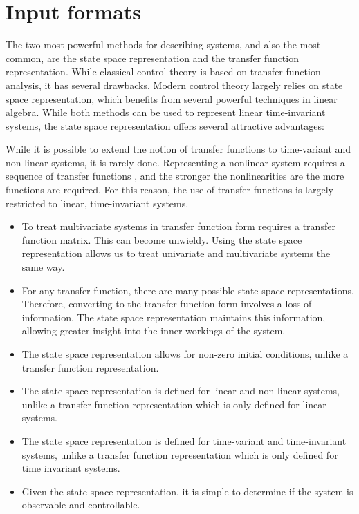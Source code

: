 \documentclass[\rootfolder/main.tex]{subfiles}
\begin{document}
\section{Input formats}

The two most powerful methods for describing systems, and also the most common, are the state space representation and the transfer function representation.
While classical control theory is based on transfer function analysis, it has several drawbacks.
Modern control theory largely relies on state space representation, which benefits from several powerful techniques in linear algebra.
While both methods can be used to represent linear time-invariant systems, the state space representation offers several attractive advantages:

While it is possible to extend the notion of transfer functions to time-variant and non-linear systems, it is rarely done.
Representing a nonlinear system requires a sequence of transfer functions \cite{Zhang1993}, and the stronger the nonlinearities are the more functions are required.
For this reason, the use of transfer functions is largely restricted to linear, time-invariant systems.

\begin{itemize}
	\item To treat multivariate systems in transfer function form requires a transfer function matrix. This can become unwieldy.
		Using the state space representation allows us to treat univariate and multivariate systems the same way.
	\item For any transfer function, there are many possible state space representations. Therefore, converting to the transfer function form involves a loss of information.
		The state space representation maintains this information, allowing greater insight into the inner workings of the system.
	\item The state space representation allows for non-zero initial conditions, unlike a transfer function representation.
	\item The state space representation is defined for linear and non-linear systems, unlike a transfer function representation which is only defined for linear systems.
	\item The state space representation is defined for time-variant and time-invariant systems, unlike a transfer function representation which is only defined for time invariant systems.
	\item Given the state space representation, it is simple to determine if the system is observable and controllable.
\end{itemize}
\end{document}
